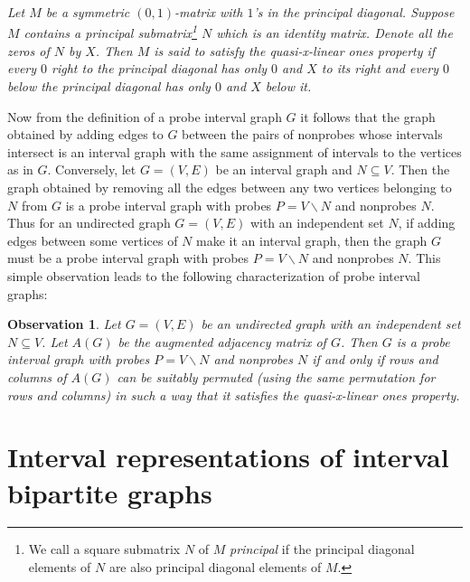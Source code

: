 \documentclass[secthm]{elsart}
\newtheorem{obs}[thm]{Observation}
\begin{document}
\begin{defn} 
{\em Let $M$ be a symmetric $(0,1)$-matrix with $1$'s in the principal diagonal. Suppose $M$ contains a principal submatrix\footnote{We call a square submatrix $N$ of $M$ {\em{principal}} if the principal diagonal elements of $N$ are also principal diagonal elements of $M$.} $N$ which is an identity matrix. Denote all the zeros of $N$ by $X$. Then $M$ is said to satisfy the {\em{quasi-x-linear ones property}} if every $0$ right to the principal diagonal has only $0$ and $X$ to its right and every $0$ below the principal diagonal has only $0$ and $X$ below it.}  
\end{defn}

\vspace{1em} Now from the definition of a probe interval graph $G$ it follows that the graph obtained by adding edges to $G$ between the pairs of nonprobes whose intervals intersect is an interval graph with the same assignment of intervals to the vertices as in $G$. Conversely, let $G=(V,E)$ be an interval graph and $N\subseteq V$. Then the graph obtained by removing all the edges between any two vertices belonging to $N$ from $G$ is a probe interval graph with probes $P=V\smallsetminus N$ and nonprobes $N$. Thus for an undirected graph $G=(V,E)$ with an independent set $N$, if adding edges between some vertices of $N$ make it an interval graph, then the graph $G$ must be a probe interval graph with probes $P=V\smallsetminus N$ and nonprobes $N$. This simple observation leads to the following characterization of probe interval graphs:

\vspace{2em}\begin{obs}\label{o:char1}
Let $G=(V,E)$ be an undirected graph with an independent set $N\subseteq V$. Let $A(G)$ be the augmented adjacency matrix of $G$. Then $G$ is a probe interval graph with probes $P=V\smallsetminus N$ and nonprobes $N$ if and only if rows and columns of $A(G)$ can be suitably permuted (using the same permutation for rows and columns) in such a way that it satisfies the quasi-x-linear ones property. 
\end{obs}

\vspace{-1.5em} \section{Interval representations of interval bipartite graphs}
\end{document}
